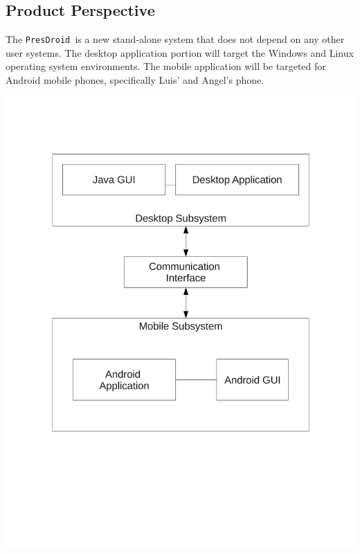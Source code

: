 \documentclass{article}
\newcommand{\pd}{\texttt{PresDroid }}
\begin{document}
\subsection{Product Perspective}
The \pd is a new stand-alone system that does not depend on any other user systems.  
The desktop application portion will target the Windows and Linux operating system environments.
The mobile application will be targeted for Android mobile phones, specifically Luis' and Angel's phone.

\begin{center}
\includegraphics[trim=0cm 5cm 0cm 3cm, clip, scale=0.4]{ppd}
\end{center}
\end{document}
